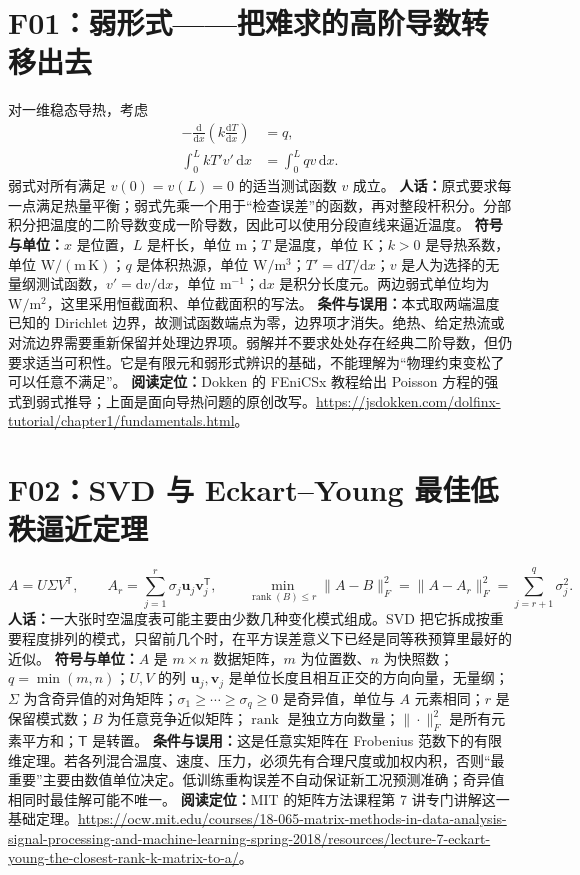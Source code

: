 \documentclass[UTF8,zihao=-4,openany,oneside,fontset=windows]{ctexbook}
\begin{document}
\section{F01：弱形式——把难求的高阶导数转移出去}
对一维稳态导热，考虑
\begin{equation}
 \begin{aligned}
 -\frac{\mathrm d}{\mathrm dx}\!\left(k\frac{\mathrm dT}{\mathrm dx}\right)&=q,\\
 \int_0^L kT'v'\,\mathrm dx&=\int_0^L qv\,\mathrm dx.
 \end{aligned}
\end{equation}
弱式对所有满足 $v(0)=v(L)=0$ 的适当测试函数 $v$ 成立。
\textbf{人话：}原式要求每一点满足热量平衡；弱式先乘一个用于“检查误差”的函数，再对整段杆积分。分部积分把温度的二阶导数变成一阶导数，因此可以使用分段直线来逼近温度。
\textbf{符号与单位：}$x$ 是位置，$L$ 是杆长，单位 m；$T$ 是温度，单位 K；$k>0$ 是导热系数，单位 $\mathrm{W/(m\,K)}$；$q$ 是体积热源，单位 $\mathrm{W/m^3}$；$T'=\mathrm dT/\mathrm dx$；$v$ 是人为选择的无量纲测试函数，$v'=\mathrm dv/\mathrm dx$，单位 $\mathrm m^{-1}$；$\mathrm dx$ 是积分长度元。两边弱式单位均为 $\mathrm{W/m^2}$，这里采用恒截面积、单位截面积的写法。
\textbf{条件与误用：}本式取两端温度已知的 Dirichlet 边界，故测试函数端点为零，边界项才消失。绝热、给定热流或对流边界需要重新保留并处理边界项。弱解并不要求处处存在经典二阶导数，但仍要求适当可积性。它是有限元和弱形式辨识的基础，不能理解为“物理约束变松了可以任意不满足”。
\textbf{阅读定位：}Dokken 的 FEniCSx 教程给出 Poisson 方程的强式到弱式推导；上面是面向导热问题的原创改写。\url{https://jsdokken.com/dolfinx-tutorial/chapter1/fundamentals.html}。

\section{F02：SVD 与 Eckart--Young 最佳低秩逼近定理}
\begin{equation}
 A=U\Sigma V^{\mathsf T},\qquad
 A_r=\sum_{j=1}^{r}\sigma_j\mathbf u_j\mathbf v_j^{\mathsf T},\qquad
 \min_{\operatorname{rank}(B)\le r}\|A-B\|_F^2
 =\|A-A_r\|_F^2=\sum_{j=r+1}^{q}\sigma_j^2.
\end{equation}
\textbf{人话：}一大张时空温度表可能主要由少数几种变化模式组成。SVD 把它拆成按重要程度排列的模式，只留前几个时，在平方误差意义下已经是同等秩预算里最好的近似。
\textbf{符号与单位：}$A$ 是 $m\times n$ 数据矩阵，$m$ 为位置数、$n$ 为快照数；$q=\min(m,n)$；$U,V$ 的列 $\mathbf u_j,\mathbf v_j$ 是单位长度且相互正交的方向向量，无量纲；$\Sigma$ 为含奇异值的对角矩阵；$\sigma_1\ge\cdots\ge\sigma_q\ge0$ 是奇异值，单位与 $A$ 元素相同；$r$ 是保留模式数；$B$ 为任意竞争近似矩阵；$\operatorname{rank}$ 是独立方向数量；$\|\cdot\|_F^2$ 是所有元素平方和；$\mathsf T$ 是转置。
\textbf{条件与误用：}这是任意实矩阵在 Frobenius 范数下的有限维定理。若各列混合温度、速度、压力，必须先有合理尺度或加权内积，否则“最重要”主要由数值单位决定。低训练重构误差不自动保证新工况预测准确；奇异值相同时最佳解可能不唯一。
\textbf{阅读定位：}MIT 的矩阵方法课程第 7 讲专门讲解这一基础定理。\url{https://ocw.mit.edu/courses/18-065-matrix-methods-in-data-analysis-signal-processing-and-machine-learning-spring-2018/resources/lecture-7-eckart-young-the-closest-rank-k-matrix-to-a/}。
\end{document}
